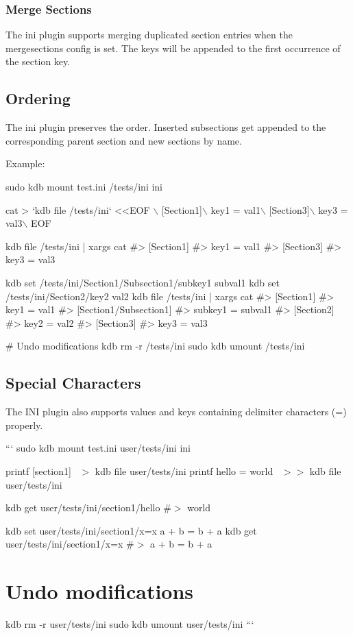 \subsubsection*{Merge Sections}

The ini plugin supports merging duplicated section entries when the {\ttfamily mergesections} config is set. The keys will be appended to the first occurrence of the section key.

\subsection*{Ordering}

The ini plugin preserves the order. Inserted subsections get appended to the corresponding parent section and new sections by name.

Example\+:


\begin{DoxyCode}
sudo kdb mount test.ini /tests/ini ini

cat > `kdb file /tests/ini` <<EOF \(\backslash\)
[Section1]\(\backslash\)
key1 = val1\(\backslash\)
[Section3]\(\backslash\)
key3 = val3\(\backslash\)
EOF

kdb file /tests/ini | xargs cat
#> [Section1]
#> key1 = val1
#> [Section3]
#> key3 = val3

kdb set /tests/ini/Section1/Subsection1/subkey1 subval1
kdb set /tests/ini/Section2/key2 val2
kdb file /tests/ini | xargs cat
#> [Section1]
#> key1 = val1
#> [Section1/Subsection1]
#> subkey1 = subval1
#> [Section2]
#> key2 = val2
#> [Section3]
#> key3 = val3

# Undo modifications
kdb rm -r /tests/ini
sudo kdb umount /tests/ini
\end{DoxyCode}


\subsection*{Special Characters}

The I\+NI plugin also supports values and keys containing delimiter characters ({\ttfamily =}) properly.

``` sudo kdb mount test.\+ini user/tests/ini ini

printf \textquotesingle{}\mbox{[}section1\mbox{]}~\newline
\textquotesingle{} $>$ {\ttfamily kdb file user/tests/ini} printf \textquotesingle{}hello = world~\newline
\textquotesingle{} $>$$>$ {\ttfamily kdb file user/tests/ini}

kdb get user/tests/ini/section1/hello \#$>$ world

kdb set user/tests/ini/section1/x=x \textquotesingle{}a + b = b + a\textquotesingle{} kdb get user/tests/ini/section1/x=x \#$>$ a + b = b + a

\section*{Undo modifications}

kdb rm -\/r user/tests/ini sudo kdb umount user/tests/ini ``` 